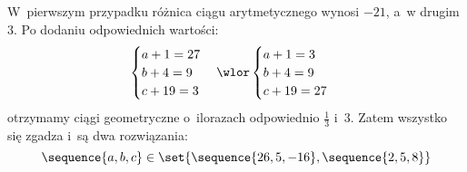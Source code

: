 W~pierwszym przypadku różnica ciągu arytmetycznego wynosi \(-21\), a~w drugim \(3\). Po dodaniu odpowiednich wartości:
\begin{equation*}
    \begin{cases}
        a + 1 = 27\\
        b + 4 = 9\\
        c + 19 = 3
    \end{cases}
    \wlor
    \begin{cases}
        a + 1 = 3\\
        b + 4 = 9\\
        c + 19 = 27
    \end{cases}
\end{equation*}
otrzymamy ciągi geometryczne o~ilorazach odpowiednio \(\frac{1}{3}\) i~\(3\). Zatem wszystko się zgadza i~są dwa rozwiązania:
\begin{equation*}
    \sequence{a, b, c} \in \set{\sequence{26, 5, -16}, \sequence{2, 5, 8}}
\end{equation*}

